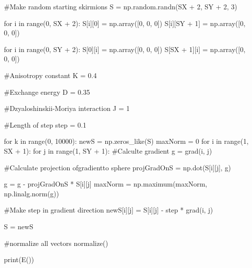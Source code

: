 \documentclass[ 12pt,x11names]{article}
\begin{document}
\begin{python}
    #Make random starting skirmions
    S = np.random.randn(SX + 2, SY + 2, 3)

    for i in range(0, SX + 2):
        S[i][0] = np.array([0, 0, 0])
        S[i][SY + 1] = np.array([0, 0, 0])

    for i in range(0, SY + 2):
        S[0][i] = np.array([0, 0, 0])
        S[SX + 1][i] = np.array([0, 0, 0])

    #Anisotropy constant
    K = 0.4

    #Exchange energy
    D = 0.35

    #Dzyaloshinskii-Moriya interaction
    J = 1

    #Length of step
    step = 0.1


    for k in range(0, 10000):
        newS = np.zeros_like(S)
        maxNorm = 0
        for i in range(1, SX + 1):
            for j in range(1, SY + 1):
                #Calculte gradient
                g = grad(i,  j)

                #Calculate projection ofgradientto sphere
                projGradOnS = np.dot(S[i][j], g)

                g = g - projGradOnS * S[i][j]
                maxNorm = np.maximum(maxNorm, np.linalg.norm(g))

                #Make step in gradient direction
                newS[i][j] = S[i][j] - step * grad(i, j)

        S = newS

        #normalize all vectors
        normalize()

print(E())
\end{python}
\end{document}
